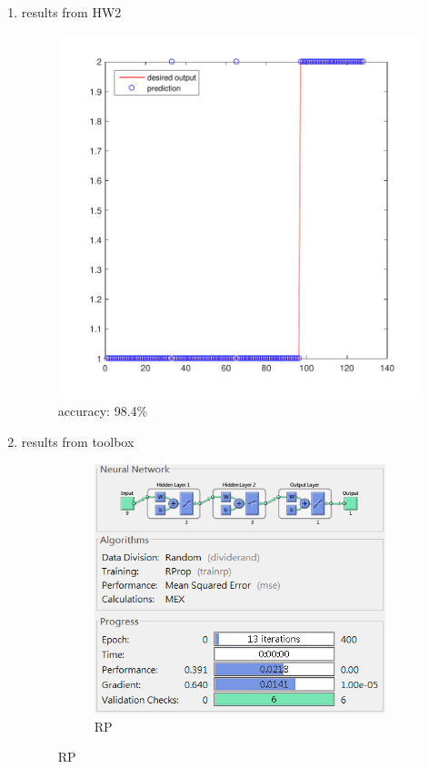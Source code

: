 \documentclass[12pt,a4paper]{article}
\begin{document}
\begin{CJK}{UTF8}{bsmi}
\begin{enumerate}
\begin{enumerate}
	 	\item results from HW2 
	 	\\
	 	\begin{figure}[H]
	 		\centering
	 		\includegraphics[scale=0.6]{breasths1}
	 		\caption{accuracy: 98.4\%} 
	 	\end{figure}
	 	\newpage
	 	\item results from toolbox 
		 	\begin{figure}[H]
	 		\centering
	 		\begin{subfigure}{.5\textwidth}
	 			\centering
	 			\includegraphics[width=0.92\linewidth]{RP3}
	 			\caption{RP}
	 			

\end{subfigure}
\end{figure}
\end{enumerate}
\end{enumerate}
\end{CJK}
\end{document}
